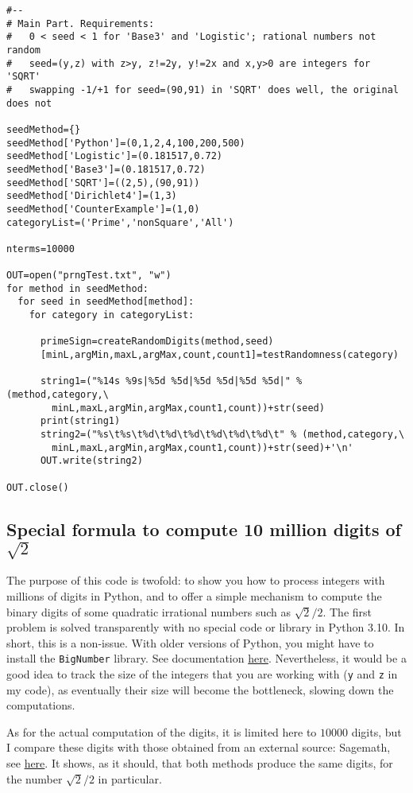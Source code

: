 \documentclass[oneside,10pt]{book}
\begin{document}
\begin{lstlisting}
#--
# Main Part. Requirements:
#   0 < seed < 1 for 'Base3' and 'Logistic'; rational numbers not random
#   seed=(y,z) with z>y, z!=2y, y!=2x and x,y>0 are integers for 'SQRT'
#   swapping -1/+1 for seed=(90,91) in 'SQRT' does well, the original does not

seedMethod={}
seedMethod['Python']=(0,1,2,4,100,200,500)
seedMethod['Logistic']=(0.181517,0.72)
seedMethod['Base3']=(0.181517,0.72)
seedMethod['SQRT']=((2,5),(90,91))
seedMethod['Dirichlet4']=(1,3)
seedMethod['CounterExample']=(1,0)
categoryList=('Prime','nonSquare','All')

nterms=10000

OUT=open("prngTest.txt", "w")
for method in seedMethod:
  for seed in seedMethod[method]:
    for category in categoryList:

      primeSign=createRandomDigits(method,seed)
      [minL,argMin,maxL,argMax,count,count1]=testRandomness(category)

      string1=("%14s %9s|%5d %5d|%5d %5d|%5d %5d|" % (method,category,\
        minL,maxL,argMin,argMax,count1,count))+str(seed) 
      print(string1)
      string2=("%s\t%s\t%d\t%d\t%d\t%d\t%d\t%d\t" % (method,category,\
        minL,maxL,argMin,argMax,count1,count))+str(seed)+'\n'
      OUT.write(string2)
    
OUT.close()
\end{lstlisting}

\subsection{Special formula to compute 10 million digits of $\sqrt{2}$}\label{zw23}

The purpose of this code is twofold: to show you how to process integers with millions of digits in Python, and to offer a simple mechanism to compute the binary digits of some quadratic irrational numbers such as $\sqrt{2}/2$. The first problem is solved transparently with no special code or library  
 in Python 3.10. In short, this is a non-issue. With older versions of Python, you might have to install the \texttt{BigNumber} library. See
 documentation \href{https://pypi.org/project/BigNumber/}{here}. Nevertheless, it would be a good idea to track the size of the integers that you are working with (\texttt{y} and \texttt{z} in my code), as eventually their size will become the bottleneck, slowing down the computations. 

As for the actual computation of the digits, it is limited here to $\num{10000}$ digits, but I compare these digits with those obtained from an external source: Sagemath, see \href{https://mltblog.com/3uMZQ4s}{here}.  It shows, as it should, that both methods produce the same digits, for the number 
 $\sqrt{2}/2$ in particular.
\end{document}
